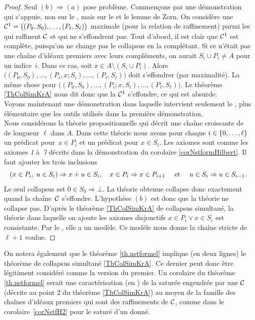 \begin{proof}
Seul $(b)\Rightarrow (a)$ pose problème. 
Commençons par une démonstration qui s'appuie, non sur le \tcg, mais sur le 
\pte et le lemme de Zorn. On considère une \proc 
${\cal C}^1=\big((P_0,S_0),\ldots,(P_\ell,S_\ell)\big)$ 
maximale (pour la relation de raffinement) parmi les \procs qui raffinent 
${\cal C}$ et qui ne s'effondrent pas. Tout d'abord, il est clair que ${\cal C}^1$ est 
complète, puisqu'on ne change pas le collapsus en la complétant.
Si ce n'était pas une chaîne d'idéaux premiers avec leurs 
compléments, on aurait \hbox{$S_i\cup P_i\neq A$} pour un indice~$i$. 
Dans ce cas, soit $x\in A\setminus (S_i\cup P_i)$. 
Alors  $\big((P_0,S_0),\ldots,(P_i,x;S_i),\ldots,(P_\ell,S_\ell)\big)$
doit s'effondrer (par maximalité). 
La même chose pour 
$\big((P_0,S_0),\ldots,(P_i;x,S_i),\ldots,(P_\ell,S_\ell)\big)$.
Le théorème \ref{ThColSimKrA} nous dit donc que la \proc 
${\cal C}^1$ s'effondre, ce qui est absurde.\\
Voyons maintenant une démonstration dans laquelle intervient seulement le \tcg, plus élémentaire que les outils utilisés dans la première démonstration.\\
Nous considérons la théorie propositionnelle qui décrit une chaîne croissante de \prois de longueur $\ell$ dans $A$.
Dans cette théorie nous avons pour chaque $i\in\{0,\dots,\ell\}$ un prédicat 
\hbox{pour $x\in P_i$} et un prédicat pour $x\in S_i$.
Les axiomes sont comme les axiomes \emph{1} à~\emph{7} décrits dans la démonstration du corolaire
\ref{corNstformHilbert}. Il faut ajouter les trois inclusions 
$$
(x\in P_i,\; u \in S_i)\Rightarrow x+u\in S_{i},\quad   x\in P_i\Rightarrow x\in P_{i+1}\quad \hbox{  et  }\quad u\in S_i\Rightarrow u\in S_{i-1}.
$$ 
Le seul collapsus est $0\in S_0\Rightarrow\bot$. La théorie obtenue collapse donc exactement quand la chaîne~${\cal C}$ s'effondre. L'hypothèse $(b)$ est donc que la théorie ne collapse pas.
D'après le théorème \ref{ThColSimKrA} de collapsus simultané, la théorie dans laquelle on ajoute les axiomes disjonctifs $x\in P_i \vee x\in S_i$ est consistante.
Par le \tcg, elle a un modèle. Ce modèle nous donne la chaîne stricte de $\ell+1$
\ideps voulue.
\end{proof}


On notera également que le théorème \ref{th.nstformel}  implique (en 
deux lignes) le théorème de collapsus simultané \ref{ThColSimKrA}. 
Ce dernier peut donc être légitiment considéré comme la version 
\cov du premier.
Un corolaire du théorème \ref{th.nstformel}  serait une 
caractérisation (en \clama) de la \proc saturée engendrée par une \proc ${\cal C}$
(décrite au point 2 du théorème \ref{ThColSimKrA}) au moyen de la famille des chaînes d'idéaux premiers qui sont des  
raffinements de ${\cal C}$, comme dans le corolaire~\ref{corNstfH2} pour le  saturé d'un \proi donné.

